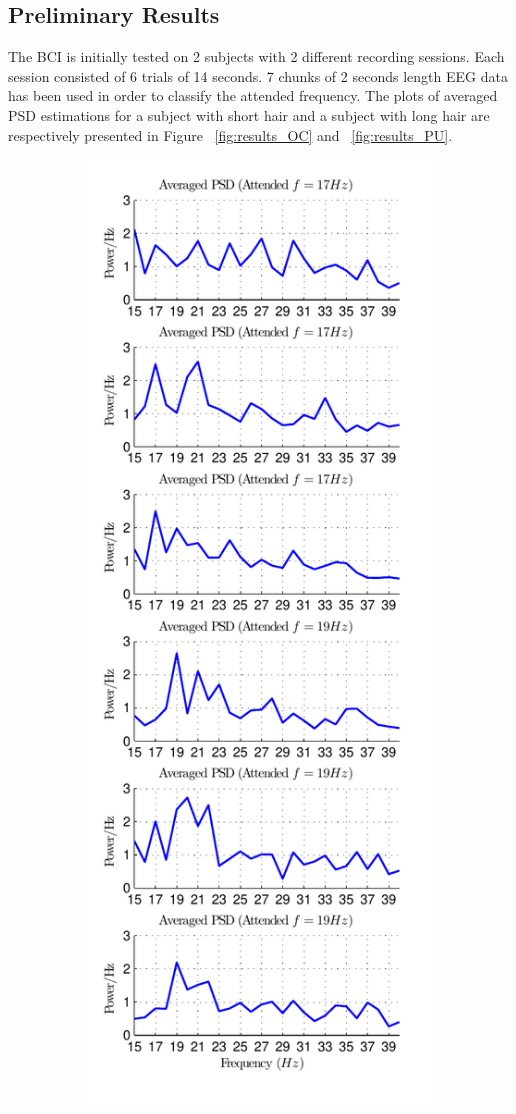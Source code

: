 \documentclass[12pt]{article}
\newcommand\mysubsection[1]{\subsection{#1}}
\numberwithin{equation}{section}
\numberwithin{figure}{section}
\numberwithin{table}{section}
\begin{document}
\mysubsection{Preliminary Results}
\par{
    The BCI is initially tested on 2 subjects with 2 different recording sessions. Each
    session consisted of 6 trials of 14 seconds. 7 chunks of 2 seconds length EEG
    data has been used in order to classify the attended frequency.
    The plots of averaged PSD estimations for a subject with short hair and a subject with long hair are
    respectively presented in Figure ~\ref{fig:results_OC} and ~\ref{fig:results_PU}.
}
\newpage
\begin{figure}
    \centering
    \begin{subfigure}{.5\textwidth}
        \centering
        \includegraphics[scale=0.85]{images/results-psd-OC_23-01-2014-16-04}

\end{subfigure}
\end{figure}
\end{document}
